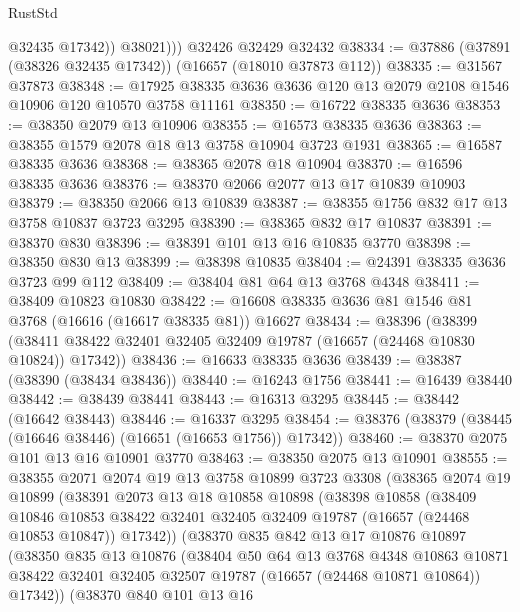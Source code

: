 \begin{lexlean}{RustStd}
\begin{coremodule}
              @32435
              @17342))
          @38021)))
    @32426
    @32429
    @32432
@38334 := @37886 (@37891 (@38326 @32435 @17342)) (@16657 (@18010 @37873 @112))
@38335 := @31567 @37873
@38348 := @17925 @38335 @3636 @3636 @120 @13 @2079 @2108 @1546 @10906 @120 @10570 @3758 @11161
@38350 := @16722 @38335 @3636
@38353 := @38350 @2079 @13 @10906
@38355 := @16573 @38335 @3636
@38363 := @38355 @1579 @2078 @18 @13 @3758 @10904 @3723 @1931
@38365 := @16587 @38335 @3636
@38368 := @38365 @2078 @18 @10904
@38370 := @16596 @38335 @3636
@38376 := @38370 @2066 @2077 @13 @17 @10839 @10903
@38379 := @38350 @2066 @13 @10839
@38387 := @38355 @1756 @832 @17 @13 @3758 @10837 @3723 @3295
@38390 := @38365 @832 @17 @10837
@38391 := @38370 @830
@38396 := @38391 @101 @13 @16 @10835 @3770
@38398 := @38350 @830 @13
@38399 := @38398 @10835
@38404 := @24391 @38335 @3636 @3723 @99 @112
@38409 := @38404 @81 @64 @13 @3768 @4348
@38411 := @38409 @10823 @10830
@38422 := @16608 @38335 @3636 @81 @1546 @81 @3768 (@16616 (@16617 @38335 @81)) @16627
@38434 := @38396
    (@38399 (@38411 @38422 @32401 @32405 @32409 @19787 (@16657 (@24468 @10830 @10824)) @17342))
@38436 := @16633 @38335 @3636
@38439 := @38387 (@38390 (@38434 @38436))
@38440 := @16243 @1756
@38441 := @16439 @38440
@38442 := @38439 @38441
@38443 := @16313 @3295
@38445 := @38442 (@16642 @38443)
@38446 := @16337 @3295
@38454 := @38376 (@38379 (@38445 (@16646 @38446) (@16651 (@16653 @1756)) @17342))
@38460 := @38370 @2075 @101 @13 @16 @10901 @3770
@38463 := @38350 @2075 @13 @10901
@38555 := @38355
    @2071
    @2074
    @19
    @13
    @3758
    @10899
    @3723
    @3308
    (@38365
      @2074
      @19
      @10899
      (@38391
        @2073
        @13
        @18
        @10858
        @10898
        (@38398
          @10858
          (@38409
            @10846
            @10853
            @38422
            @32401
            @32405
            @32409
            @19787
            (@16657 (@24468 @10853 @10847))
            @17342))
        (@38370
          @835
          @842
          @13
          @17
          @10876
          @10897
          (@38350
            @835
            @13
            @10876
            (@38404
              @50
              @64
              @13
              @3768
              @4348
              @10863
              @10871
              @38422
              @32401
              @32405
              @32507
              @19787
              (@16657 (@24468 @10871 @10864))
              @17342))
          (@38370
            @840
            @101
            @13
            @16

\end{coremodule}
\end{lexlean}
